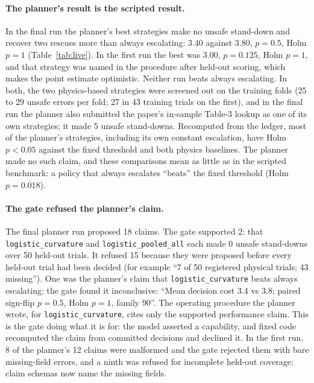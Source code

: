 \documentclass[11pt]{article}
\begin{document}
\paragraph{The planner's result is the scripted result.} In the final run the planner's best strategies make no unsafe
stand-down and recover two rescues more than always escalating: 3.40 against 3.80, $p = 0.5$, Holm $p = 1$
(Table~\ref{tab:live}). In the first run the best was 3.00, $p = 0.125$, Holm $p = 1$, and that strategy was named in
the procedure after held-out scoring, which makes the point estimate optimistic. Neither run beats always escalating.
In both, the two physics-based strategies were screened out on the training folds (25 to 29 unsafe errors per fold;
27 in 43 training trials on the first), and in the final run the planner also submitted the paper's in-sample Table-3 lookup as one of its own
strategies; it made 5 unsafe stand-downs. Recomputed from the ledger, most of the planner's strategies, including its own
constant escalation, have Holm $p < 0.05$ against the fixed threshold and both physics baselines. The planner made no
such claim, and these comparisons mean as little as in the scripted benchmark: a policy that always escalates
``beats'' the fixed threshold (Holm $p = 0.018$).

\paragraph{The gate refused the planner's claim.} The final planner run proposed 18 claims. The gate supported 2: that
\texttt{logistic\_curvature} and \texttt{logistic\_pooled\_all} each made 0 unsafe stand-downs over 50 held-out trials.
It refused 15 because they were proposed before every held-out trial had been decided (for example ``7 of 50 registered
physical trials; 43 missing''). One was the planner's claim that \texttt{logistic\_curvature} beats always escalating;
the gate found it inconclusive: ``Mean decision cost 3.4 vs 3.8; paired sign-flip $p=0.5$, Holm $p=1$, family 90''.
The operating procedure the planner wrote, for \texttt{logistic\_curvature}, cites only the supported performance
claim. This is the gate doing what it is for: the model asserted a capability, and fixed code recomputed the claim
from committed decisions and declined it. In the first run, 8 of the planner's 12 claims were malformed and the gate
rejected them with bare missing-field errors, and a ninth was refused for incomplete held-out coverage; claim schemas
now name the missing fields.
\end{document}
